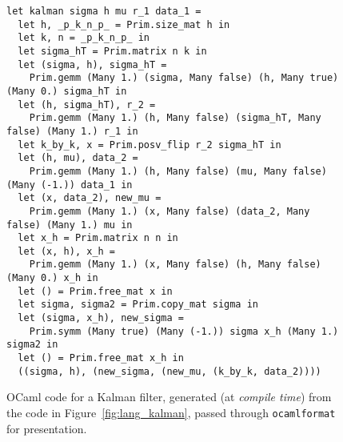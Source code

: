 \begin{figure}[h]
\begin{center}
    \begin{verbatim}
let kalman sigma h mu r_1 data_1 =
  let h, _p_k_n_p_ = Prim.size_mat h in
  let k, n = _p_k_n_p_ in
  let sigma_hT = Prim.matrix n k in
  let (sigma, h), sigma_hT =
    Prim.gemm (Many 1.) (sigma, Many false) (h, Many true) (Many 0.) sigma_hT in
  let (h, sigma_hT), r_2 =
    Prim.gemm (Many 1.) (h, Many false) (sigma_hT, Many false) (Many 1.) r_1 in
  let k_by_k, x = Prim.posv_flip r_2 sigma_hT in
  let (h, mu), data_2 =
    Prim.gemm (Many 1.) (h, Many false) (mu, Many false) (Many (-1.)) data_1 in
  let (x, data_2), new_mu =
    Prim.gemm (Many 1.) (x, Many false) (data_2, Many false) (Many 1.) mu in
  let x_h = Prim.matrix n n in
  let (x, h), x_h =
    Prim.gemm (Many 1.) (x, Many false) (h, Many false) (Many 0.) x_h in
  let () = Prim.free_mat x in
  let sigma, sigma2 = Prim.copy_mat sigma in
  let (sigma, x_h), new_sigma =
    Prim.symm (Many true) (Many (-1.)) sigma x_h (Many 1.) sigma2 in
  let () = Prim.free_mat x_h in
  ((sigma, h), (new_sigma, (new_mu, (k_by_k, data_2))))
    \end{verbatim}
    \caption{OCaml code for a Kalman filter, generated (at \emph{compile time})
        from the code in Figure~\ref{fig:lang_kalman}, passed through
        \texttt{ocamlformat} for presentation.}\label{fig:ocaml_kalman}

\vspace{\baselineskip}


\end{center}
\end{figure}
